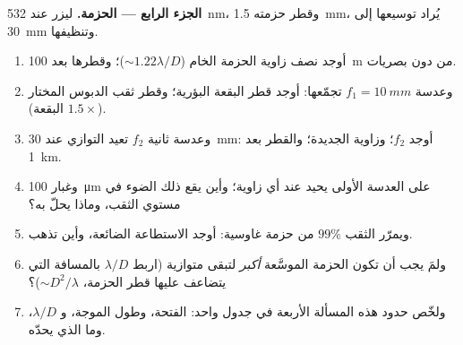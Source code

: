 \begin{problem}
\medskip
\noindent\textbf{الجزء الرابع --- الحزمة.}
ليزر عند \qty{532}{nm}، وقطر حزمته \qty{1.5}{mm}، يُراد توسيعها إلى
\qty{30}{mm} وتنظيفها.
\begin{enumerate}[resume]
  \item أوجد نصف زاوية  الحزمة الخام ($\sim1.22\lambda/D$)؛ وقطرها
        بعد \qty{100}{m} من دون بصريات.
  \item وعدسة $f_1 = \qty{10}{mm}$ تجمّعها: أوجد قطر البقعة البؤرية؛
        وقطر ثقب الدبوس المختار ($1.5\times$ البقعة).
  \item وعدسة ثانية $f_2$ تعيد التوازي عند \qty{30}{mm}: أوجد $f_2$؛ وزاوية
         الجديدة؛ والقطر بعد \qty{1}{km}.
  \item وغبار \qty{100}{\micro m} على العدسة الأولى يحيد عند أي زاوية؛
        وأين يقع ذلك الضوء في مستوي الثقب، وماذا
        يحلّ به؟
  \item ويمرّر الثقب $99\%$ من حزمة غاوسية: أوجد الاستطاعة الضائعة، وأين
        تذهب.
  \item ولمَ يجب أن تكون الحزمة الموسَّعة \emph{أكبر} لتبقى متوازية
        (اربط $\lambda/D$ بالمسافة التي يتضاعف عليها قطر الحزمة،
        $\sim D^2/\lambda$)؟
  \item ولخّص حدود هذه المسألة الأربعة في جدول واحد: الفتحة،
        وطول الموجة، و $\lambda/D$، وما الذي يحدّه.
\end{enumerate}
\end{problem}
